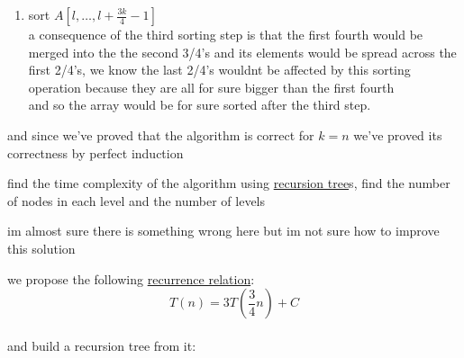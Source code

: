 \documentclass[a4paper,12pt]{article}
\begin{document}
\begin{question}
\begin{subquestion}
\begin{answer}
\begin{enumerate}
\[ \left(\forall x \in A\left[l,\dots,l+\frac{n}{4}-1\right]\right)\left(\forall y \in A\left[l+\frac{2n}{4},\dots,l+n-1\right]\right)[x \ge y] \]\\
in words: each element in the last 2/4's of the array is bigger than all elements in the first fourth of the array\\
\item sort \(A\left[l,\dots,l+\frac{3k}{4}-1\right]\)\\
a consequence of the third sorting step is that the first fourth would be merged into the the second 3/4's and its elements would be spread across the first 2/4's, we know the last 2/4's wouldnt be affected by this sorting operation because they are all for sure bigger than the first fourth\\
and so the array would be for sure sorted after the third step.\\
\end{enumerate}
and since we've proved that the algorithm is correct for \(k=n\) we've proved its correctness by perfect induction\\
\end{answer}
\end{subquestion}
\begin{subquestion}
find the time complexity of the algorithm using \href{20221105001640-recursive_function.org}{recursion tree}s, find the number of nodes in each level and the number of levels\\
\begin{note}
im almost sure there is something wrong here but im not sure how to improve this solution\\
\end{note}
\begin{answer}
we propose the following \href{20221105001640-recursive_function.org}{recurrence relation}:\\
\[
  T(n) = 3T\left(\frac{3}{4}n\right) + C
\]\\
and build a recursion tree from it:\\
\begin{center}

\end{center}


\end{answer}
\end{subquestion}
\end{question}
\end{document}
